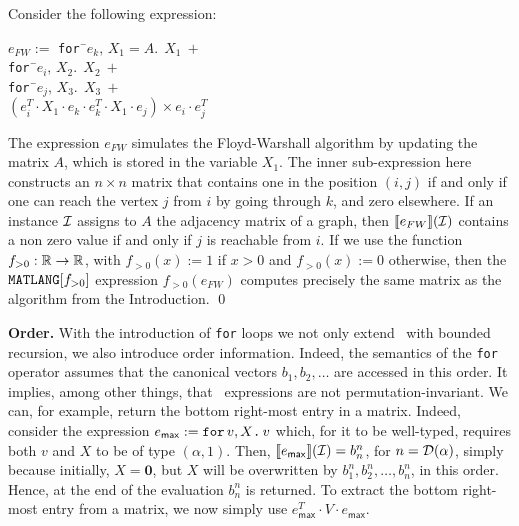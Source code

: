 \begin{example}\label{ex:floyd}
Consider the following expression:
\begin{tabbing}
$e_{FW} := $ \texttt{for\,}\=$e_k,\, X_1\!=\!A.\ \ X_1 \ + $\\
\> \texttt{for\,}\=$e_i, \, X_2.\ \ X_2 \ +$ \\
\>\>\texttt{for\,}\=$e_j,\, X_3.\ \ X_3 \ +$ \\
\>\>\>$(e_i^T\cdot X_1\cdot e_k \cdot e_k^T\cdot X_1\cdot e_j)\times e_i\cdot e_j^T$
\end{tabbing}
The expression $e_{FW}$ simulates the Floyd-Warshall algorithm by updating the matrix $A$, which is stored in the variable $X_1$. The inner sub-expression here constructs an $n\times n$ matrix that contains one in the position $(i,j)$ if and only if one can reach the vertex $j$ from $i$ by going through $k$, and zero elsewhere. If an instance $\mathcal{I}$ assigns to $A$ the adjacency matrix of a graph, then $\llbracket e_{FW} \rrbracket(\mathcal{I})$ contains a non zero value if and only if $j$ is reachable from $i$. If we use the function $f_{>0}:\mathbb{R}\to\mathbb{R}$, with $f_{>0}(x):=1$ if $x>0$ and $f_{>0}(x):=0$ otherwise, then the $\texttt{MATLANG}[f_{>0}]$ expression $f_{>0}(e_{FW})$ computes precisely the same matrix as the algorithm from the Introduction.
\qed
\end{example}


\noindent\textbf{Order.} With the introduction of \texttt{for} loops we not only extend \lang\ with bounded recursion, we also introduce order information. Indeed, the semantics of the \texttt{for} operator assumes that the canonical vectors $b_1,b_2,\ldots$
are accessed in this order. It implies, among other things, that \langfor\ expressions are not permutation-invariant.
We can, for example, return the bottom right-most entry in a matrix. Indeed, consider the expression $e_{\mathsf{max}} := \texttt{for}\, v,X \texttt{.}\, v$ which, for it to be well-typed, requires both $v$ and $X$ to be of type $(\alpha,1)$. Then, $\llbracket e_{\mathsf{max}} \rrbracket(\mathcal{I})=b_n^n$, for $n=\mathcal{D}(\alpha)$, simply because initially, $X=\mathbf{0}$, but $X$ will be overwritten by $b_1^n,b_2^n,\ldots,b_n^n$, in this order. Hence, at the end of the evaluation $b_n^n$ is returned.
To extract the bottom right-most entry from a matrix, we now simply use $e_{\mathsf{max}}^T\cdot V\cdot e_{\mathsf{max}}$.

